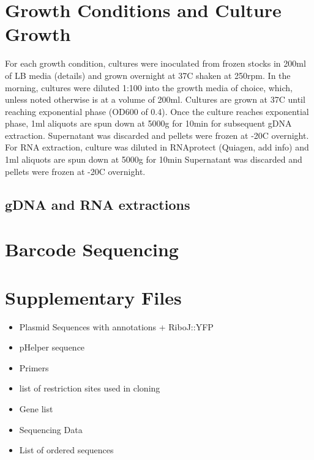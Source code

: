 \section{Growth Conditions and Culture Growth}
\label{sec:culture_growth}
For each growth condition, cultures were inoculated from frozen stocks in 200ml of LB media (details) and grown overnight at 37C shaken at 250rpm. In the morning, cultures were diluted 1:100 into the growth media of choice, which, unless noted otherwise is at a volume of 200ml. Cultures are grown at 37C until reaching exponential phase (OD600 of 0.4). Once the culture reaches exponential phase, 1ml aliquots are spun down at 5000g for 10min for subsequent gDNA extraction. Supernatant was discarded and pellets were frozen at -20C overnight. For RNA extraction, culture was diluted in RNAprotect (Quiagen, add info) and 1ml aliquots are spun down at 5000g for 10min Supernatant was discarded and pellets were frozen at -20C overnight.

\subsection{gDNA and RNA extractions}
\label{sec:dna_rna_extract}


\section{Barcode Sequencing}
\label{sec:barcode_seq}


\section{Supplementary Files}
\label{sec:SI_files}
\begin{itemize}
    \item Plasmid Sequences with annotations + RiboJ::YFP
    \item pHelper sequence
    \item Primers
    \item list of restriction sites used in cloning
    \item Gene list
    \item Sequencing Data
    \item List of ordered sequences
\end{itemize}

\newpage

